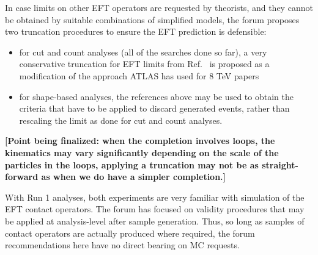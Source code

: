 \documentclass[a4,debug,notitlepage,nobib]{tufte-handout}
\begin{document}
In case limits on other EFT operators are requested by theorists, and they
cannot be obtained by suitable combinations of simplified models, the
forum proposes two truncation procedures to ensure the EFT prediction
is defensible:

\begin{itemize}
\item for cut and count analyses (all of the searches done so far), a very conservative truncation for EFT 
limits from Ref.~\cite{Racco:2015dxa} is proposed as a modification of the approach 
ATLAS has used for 8 TeV papers~\cite{Aad:2015zva}
\item for shape-based analyses, the references above may be used to obtain the criteria that 
have to be applied to discard generated events, rather than rescaling the limit as done
for cut and count analyses. 
\end{itemize}

\textbf{[Point being finalized: when the completion involves loops, 
the kinematics may vary significantly depending on the scale of the particles in 
the loops, applying a truncation may not be as straight-forward as when we do have a simpler completion.]}

With Run 1 analyses, both experiments are very familiar with
simulation of the EFT contact operators. The forum has focused on
validity procedures that may be applied at analysis-level after sample
generation. Thus, so long as samples of contact operators are actually
produced where required, the forum recommendations here have no direct
bearing on MC requests.




\end{document}
